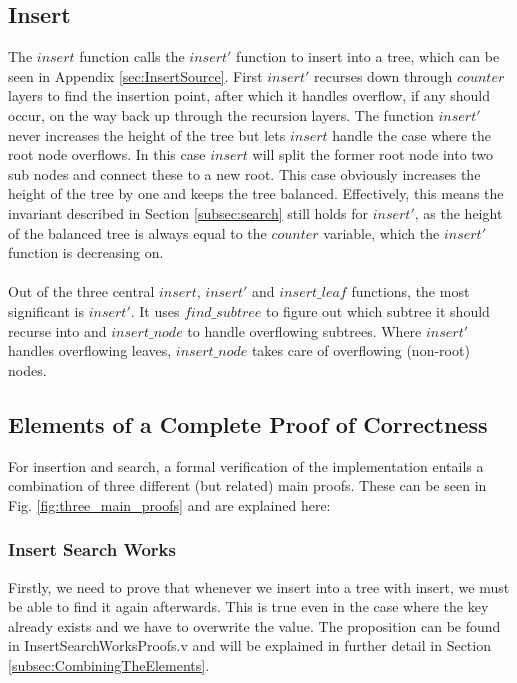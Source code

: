 \subsection{Insert}
The $insert$ function calls the $insert'$ function to insert into a tree, which can be seen in Appendix \ref{sec:InsertSource}. First $insert'$ recurses down through $counter$ layers to find the insertion point, after which it handles overflow, if any should occur, on the way back up through the recursion layers. The function $insert'$ never increases the height of the tree but lets $insert$ handle the case where the root node overflows. In this case $insert$ will split the former root node into two sub nodes and connect these to a new root. This case obviously increases the height of the tree by one and keeps the tree balanced. Effectively, this means the invariant described in Section \ref{subsec:search} still holds for $insert'$, as the height of the balanced tree is always equal to the $counter$ variable, which the $insert'$ function is decreasing on.

\paragraph{}
Out of the three central $insert$, $insert'$ and $insert\_leaf$ functions, the most significant is $insert'$. It uses $find\_subtree$ to figure out which subtree it should recurse into and $insert\_node$ to handle overflowing subtrees. Where $insert'$ handles overflowing leaves, $insert\_node$ takes care of overflowing (non-root) nodes.

\subsection{Elements of a Complete Proof of Correctness}
\label{sec:ElementsOfACompleteProof}
For insertion and search, a formal verification of the implementation entails a combination of three different (but related) main proofs. These can be seen in Fig. \ref{fig:three_main_proofs} and are explained here:

\subsubsection{Insert Search Works}
Firstly, we need to prove that whenever we insert into a tree with insert, we must be able to find it again afterwards. This is true even in the case where the key already exists and we have to overwrite the value. The proposition can be found in InsertSearchWorksProofs.v and will be explained in further detail in Section \ref{subsec:CombiningTheElements}.

